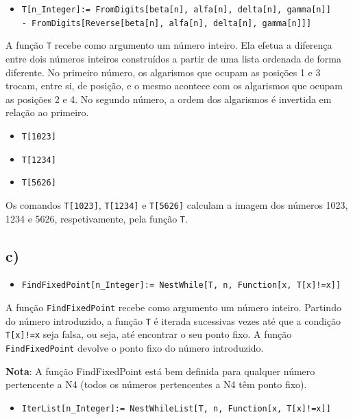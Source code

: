 \documentclass[12pt,a4paper]{article}
\begin{document}
        \begin{itemize}
            \item \texttt{T[n\_Integer]:= FromDigits[{beta[n], alfa[n], delta[n], gamma[n]}] \\ - FromDigits[Reverse[{beta[n], alfa[n], delta[n], gamma[n]}]]}
        \end{itemize}
        
        A função \texttt{T} recebe como argumento um número inteiro. Ela efetua a diferença entre dois números inteiros construídos a partir de uma lista ordenada de forma diferente. No primeiro número, os algarismos que ocupam as posições 1 e 3 trocam, entre si, de posição, e o mesmo acontece com os algarismos que ocupam as posições 2 e 4. No segundo número, a ordem dos algarismos é invertida em relação ao primeiro.
        
        \begin{itemize}
            \item \texttt{T[1023]}
            \item \texttt{T[1234]}
            \item \texttt{T[5626]}
        \end{itemize}
        
        Os comandos \texttt{T[1023]}, \texttt{T[1234]} e \texttt{T[5626]} calculam a imagem dos números 1023, 1234 e 5626, respetivamente, pela função \texttt{T}.

    \subsection{c)}
        \begin{itemize}
            \item \texttt{FindFixedPoint[n\_Integer]:= NestWhile[T, n, Function[x, T[x]!=x]]}
        \end{itemize}
        
        A função \texttt{FindFixedPoint} recebe como argumento um número inteiro. Partindo do número introduzido, a função \texttt{T} é iterada sucessivas vezes até que a condição \texttt{T[x]!=x} seja falsa, ou seja, até encontrar o seu ponto fixo. A função \texttt{FindFixedPoint} devolve o ponto fixo do número introduzido.

        \textbf{Nota}: A função FindFixedPoint está bem definida para qualquer número pertencente a N4 (todos os números pertencentes a N4 têm ponto fixo).
        
        \begin{itemize}
            \item \texttt{IterList[n\_Integer]:= NestWhileList[T, n, Function[x, T[x]!=x]]}
        \end{itemize}
        
\end{document}
